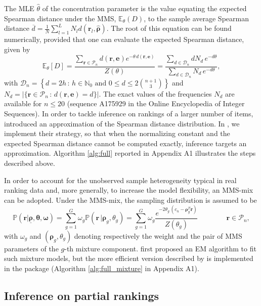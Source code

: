The MLE $\hat\theta$ of the concentration parameter is the value equating the expected Spearman distance under the MMS, $\mathbb{E}_\theta(D)$, to the sample average Spearman distance $\overline{d}=\frac{1}{N}\sum_{l=1}^LN_ld(\bm{r}_l,\hat{\bm{\rho}})$. The root of this equation can be found numerically, provided that one can evaluate the expected Spearman distance, given by
$$\mathbb{E}_{\theta}[D] = \frac{\sum_{\bm{r} \in \mathcal{P}_{n}} d(\bm{r},\bm e) e^{-\theta\, d(\bm{r},\bm e)}}{Z(\theta)}=
\frac{\sum_{d\in\mathcal{D}_n}dN_d \,e^{-d\theta}}{\sum_{d\in\mathcal{D}_n}N_d \,e^{-d\theta}},$$
with $\mathcal{D}_n=\left\{d=2h\, : \, h\in\mathbb{N}_0\text{ and } 0\leq d\leq 2\binom{n+1}{3}\right\}$ and $N_d=\vert\{\bm{r}\in\mathcal{P}_{n}\,:\,d(\bm{r},\bm{e})=d\}\vert$. The exact values of the frequencies $N_d$ are available for $n\leq 20$ (sequence A175929 in the Online Encyclopedia of Integer Sequences). In order to tackle inference on rankings of a larger number of items, \cite{crispino23efficient} introduced an approximation of the Spearman distance distribution.
In , we implement their strategy, so that when the normalizing constant and the expected Spearman distance cannot be computed exactly, inference targets an approximation.  Algorithm \ref{alg:full} reported in Appendix A1 illustrates the steps described above.

In order to account for the unobserved sample heterogeneity typical in real ranking data and, more generally, to increase the model flexibility, an MMS-mix can be adopted. Under the MMS-mix, the sampling distribution is assumed to be
\begin{equation*}
\label{e:CLog.lik.mixEPL}
\mathbb{P}(\bm{r}|\underline{\bm{\rho}},{\bm{\theta}},{\bm{\omega}})
=\sum_{g=1}^G\omega_g\mathbb{P}(\bm{r}\,|\bm{\rho}_g,\theta_g)
=\sum_{g=1}^G\omega_g\frac{e^{-2\theta_g\, \left(c_n-\bm{\rho}_g^T\bm{r}\right)}}{Z(\theta_g)}\qquad\qquad\bm{r}\in\mathcal{P}_n,
\end{equation*}
%
with $\omega_g$ and $(\bm{\rho}_g,\theta_g)$ denoting respectively the weight and the pair of MMS parameters of the $g$-th mixture component.
\cite{MurphyMartin2003} first proposed an EM algorithm to fit such mixture models, but the more efficient version described by \cite{crispino23efficient} is implemented in the  package (Algorithm \ref{alg:full_mixture} in Appendix A1).

\subsection{Inference on partial rankings}
\label{ssec:partial}


